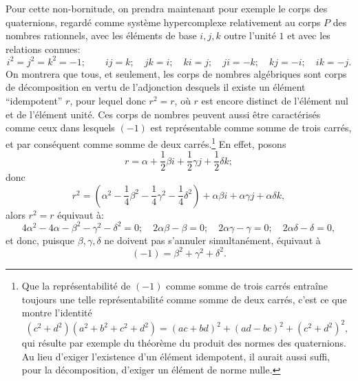 Pour cette non-bornitude, on prendra maintenant pour exemple le corps des quaternions, regardé comme système hypercomplexe relativement au corps $P$ des nombres rationnels, avec les éléments de base $i,j,k$ outre l'unité $1$ et avec les relations connues:
\[
 i^2=j^2=k^2=-1;\qquad ij=k;\quad jk=i;\quad ki=j;\quad ji=-k;\quad kj=-i;\quad ik=-j.
\]
On montrera que tous, et seulement, les corps de nombres algébriques sont corps de décomposition en vertu de l'adjonction desquels il existe un élément ``idempotent'' $r$, pour lequel donc $r^2=r$, où $r$ est encore distinct de l'élément nul et de l'élément unité. Ces corps de nombres peuvent aussi être caractérisés comme ceux dans lesquels $(-1)$ est représentable comme somme de trois carrés, et par conséquent comme somme de deux carrés.\footnote{Que la représentabilité de $(-1)$ comme somme de trois carrés entraîne toujours une telle représentabilité comme somme de deux carrés, c'est ce que montre l'identité
\[
(c^2+d^2)(a^2+b^2+c^2+d^2)=(ac+bd)^2+(ad-bc)^2+(c^2+d^2)^2,
\]
qui résulte par exemple du théorème du produit des normes des quaternions. Au lieu d'exiger l'existence d'un élément idempotent, il aurait aussi suffi, pour la décomposition, d'exiger un élément de norme nulle.} En effet, posons
\[
        r=\alpha+\frac12\beta i+\frac12\gamma j+\frac12\delta k;
\]
donc
\[
        r^2=\left(\alpha^2-\frac14\beta^2-\frac14\gamma^2-\frac14\delta^2\right)
          +\alpha\beta i+\alpha\gamma j+\alpha\delta k,
\]
alors $r^2=r$ équivaut à:
\[
4\alpha^2-4\alpha-\beta^2-\gamma^2-\delta^2=0;\quad
2\alpha\beta-\beta=0;\quad 2\alpha\gamma-\gamma=0;\quad 2\alpha\delta-\delta=0,
\]
et donc, puisque $\beta,\gamma,\delta$ ne doivent pas s'annuler simultanément, équivaut à
\[
        (-1)=\beta^2+\gamma^2+\delta^2.
\]

